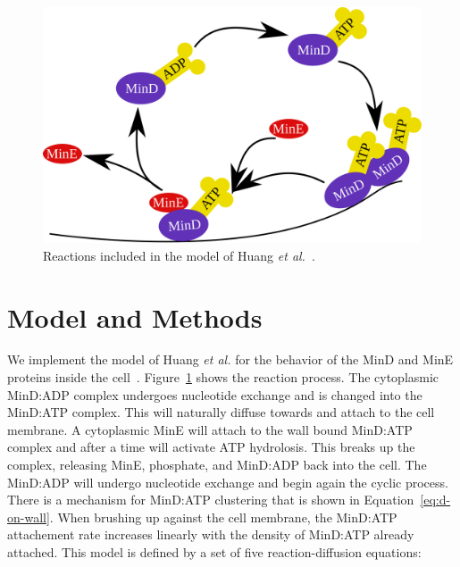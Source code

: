 \documentclass[letterpaper,twocolumn,amsmath,amssymb,pre]{revtex4-1}
\begin{document}
\begin{figure}
  \includegraphics[width=\columnwidth]{reactions}
  \caption{Reactions included in the model of Huang \emph{et
      al.}~\cite{huang2003dynamic}.}\label{fig:reactions}
\end{figure}

\section{Model and Methods}
We implement the model of Huang \emph{et al.}  for the behavior of the
MinD and MinE proteins inside the cell~\cite{huang2003dynamic}.
Figure~\ref{fig:reactions} shows the reaction process.  The
cytoplasmic MinD:ADP complex undergoes nucleotide exchange and is
changed into the MinD:ATP complex.  This will naturally diffuse
towards and attach to the cell membrane.  A cytoplasmic MinE will
attach to the wall bound MinD:ATP complex and after a time will
activate ATP hydrolosis.  This breaks up the complex, releasing MinE,
phosphate, and MinD:ADP back into the cell.  The MinD:ADP will undergo
nucleotide exchange and begin again the cyclic process.  There is a
mechanism for MinD:ATP clustering that is shown in
Equation~\ref{eq:d-on-wall}.  When brushing up against the cell
membrane, the MinD:ATP attachement rate increases linearly with the
density of MinD:ATP already attached.  This model is defined by a set of
five reaction-diffusion equations:
\end{document}
